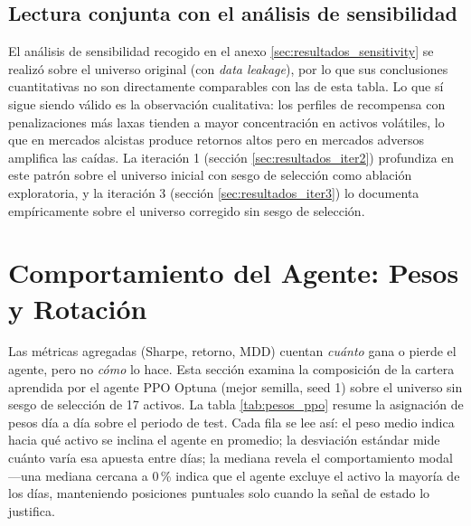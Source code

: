 \documentclass[IB,a4paper]{TFUOC}
\begin{document}
\subsection{Lectura conjunta con el análisis de sensibilidad}

El análisis de sensibilidad recogido en el anexo \ref{sec:resultados_sensitivity} se realizó sobre el universo original (con \textit{data leakage}), por lo que sus conclusiones cuantitativas no son directamente comparables con las de esta tabla. Lo que sí sigue siendo válido es la observación cualitativa: los perfiles de recompensa con penalizaciones más laxas tienden a mayor concentración en activos volátiles, lo que en mercados alcistas produce retornos altos pero en mercados adversos amplifica las caídas. La iteración 1 (sección \ref{sec:resultados_iter2}) profundiza en este patrón sobre el universo inicial con sesgo de selección como ablación exploratoria, y la iteración 3 (sección \ref{sec:resultados_iter3}) lo documenta empíricamente sobre el universo corregido sin sesgo de selección.

\section{Comportamiento del Agente: Pesos y Rotación}
\label{sec:resultados_pesos}

Las métricas agregadas (Sharpe, retorno, MDD) cuentan \textit{cuánto} gana o pierde el agente, pero no \textit{cómo} lo hace. Esta sección examina la composición de la cartera aprendida por el agente PPO Optuna (mejor semilla, seed 1) sobre el universo sin sesgo de selección de 17 activos. La tabla \ref{tab:pesos_ppo} resume la asignación de pesos día a día sobre el periodo de test. Cada fila se lee así: el peso medio indica hacia qué activo se inclina el agente en promedio; la desviación estándar mide cuánto varía esa apuesta entre días; la mediana revela el comportamiento modal —una mediana cercana a $0$\,\% indica que el agente excluye el activo la mayoría de los días, manteniendo posiciones puntuales solo cuando la señal de estado lo justifica.
\end{document}
